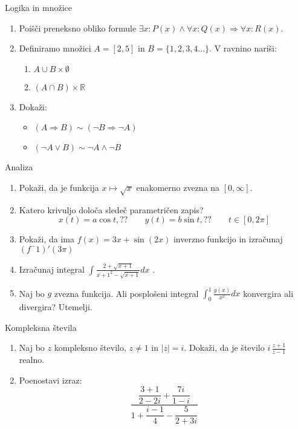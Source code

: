 \begin{frame}{Logika in množice}
	\begin{enumerate}
		\item
		Poišči preneksno obliko formule $\exists x :P(x) \land \forall x : Q(x) \Rightarrow \forall x:R(x)$.
		\item 
		Definiramo množici $A=[2,5]$ in $B=\{1,2,3,4 ...\}$.
		V ravnino nariši:
		\begin{enumerate}
		   \item $ A \cup B \times \emptyset $
		   \item  $(A \cap B) \times \mathbb{R} $
		\end{enumerate}
		\item
		Dokaži:
		\begin{itemize}
			\item $(A \Rightarrow B) \sim (\lnot B \Rightarrow \lnot A )$
			\item $ (\lnot A \lor B) \sim \lnot A \land \lnot B $
		\end{itemize}
	\end{enumerate}
\end{frame}

\begin{frame}{Analiza}
	\begin{enumerate}
		\item
		Pokaži, da je funkcija $x \mapsto \sqrt{x}$ enakomerno zvezna na $[0,\infty]$.
		\item 
		Katero krivuljo določa sledeč parametričen zapis?
		$$
		   x(t) = a \cos t, ?? \qquad %
		   y(t) = b \sin t, ??  \qquad%
		   t \in [0, 2 \pi]
		$$                  %
		\item
		Pokaži, da ima $f(x)=3x+\sin(2x)$ inverzno funkcijo in izračunaj $ (f^-1)'(3\pi)$
		
		\item
		Izračunaj integral 
		$ \displaystyle \int \frac{2+\sqrt{x+1}}{{x+1}^2 -\sqrt{x+1}} dx $ .
		
		\item 
		Naj bo $g$ zvezna funkcija. Ali posplošeni integral 
		$\int_{0}^{1}\frac{g(x)}{x^2} dx $
		konvergira ali divergira? Utemelji.
	\end{enumerate}
\end{frame}

\begin{frame}{Kompleksna števila}
	\begin{enumerate}
		\item
		Naj bo $z$ kompleksno število, $z \ne 1$ in $ |z|=i$.
		Dokaži, da je število \( i \, \frac{z+1}{z-1} \) realno.
		\item
		Poenostavi izraz:
	      $$\frac{\dfrac{3+1}{2-2i}+\dfrac{7i}{1-i}}{1+\dfrac{i-1}{4}-\dfrac{5}{2+3i}} $$
	\end{enumerate}
\end{frame}